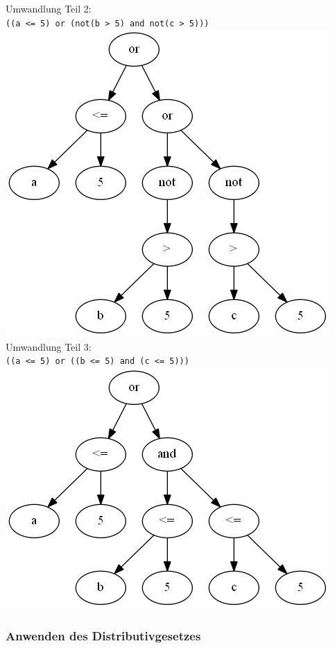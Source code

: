 \newpage
Umwandlung Teil 2:\\
\verb|((a <= 5) or (not(b > 5) and not(c > 5)))| \\\includegraphics[scale=0.5]{Bilder/not_graph3.png}\\

Umwandlung Teil 3:\\
\verb|((a <= 5) or ((b <= 5) and (c <= 5)))| \\\includegraphics[scale=0.5]{Bilder/not_graph4.png}\\


\subsubsection{Anwenden des Distributivgesetzes}

